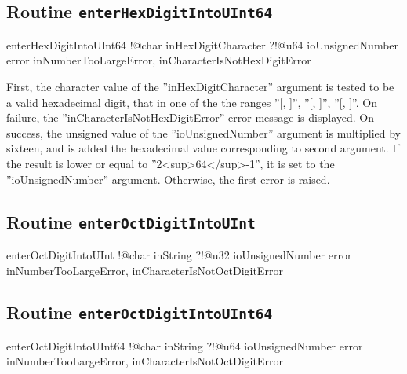 \subsection{Routine \texttt{enterHexDigitIntoUInt64}}

\begin{galgas4}
enterHexDigitIntoUInt64 !@char inHexDigitCharacter
                        ?!@u64 ioUnsignedNumber
                        error inNumberTooLargeError,
                              inCharacterIsNotHexDigitError
\end{galgas4}

First, the character value of the ''inHexDigitCharacter'' argument is tested to be a valid hexadecimal digit, that in one of the the ranges ''[\textquotesingle, \textquotesingle]'', ''[\textquotesingle, \textquotesingle]'', ''[\textquotesingle, \textquotesingle]''. On failure, the ''inCharacterIsNotHexDigitError'' error message is displayed. On success, the unsigned value of the ''ioUnsignedNumber'' argument is multiplied by sixteen, and is added the hexadecimal value corresponding to second argument. If the result is lower or equal to ''2<sup>64</sup>-1'', it is set to the ''ioUnsignedNumber'' argument. Otherwise, the first error is raised.

\subsection{Routine \texttt{enterOctDigitIntoUInt}}

\begin{galgas4}
enterOctDigitIntoUInt !@char inString
                      ?!@u32 ioUnsignedNumber
                      error inNumberTooLargeError,
                            inCharacterIsNotOctDigitError
\end{galgas4}

\subsection{Routine \texttt{enterOctDigitIntoUInt64}}

\begin{galgas4}
enterOctDigitIntoUInt64 !@char inString
                        ?!@u64 ioUnsignedNumber
                        error inNumberTooLargeError,
                              inCharacterIsNotOctDigitError
\end{galgas4}

